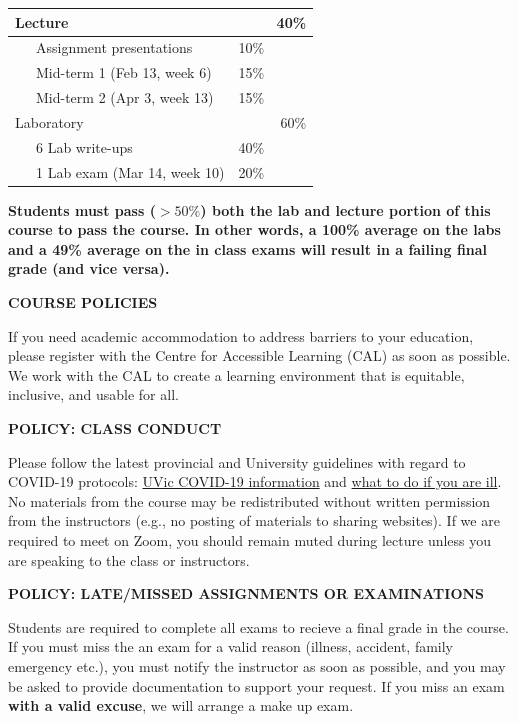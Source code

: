 \documentclass[11pt]{article}
\begin{document}
\begin{center}
		\begin{tabular}{ lr }
			Lecture                     & 40\%       \\
			\hline
			~~~Assignment presentations  & 10\%~~~~~~ \\
			~~~Mid-term 1 (Feb 13, week 6)  & 15\%~~~~~~ \\
			~~~Mid-term 2 (Apr 3, week 13)  & 15\%~~~~~~ \\
			Laboratory                  & 60\%       \\
			\hline
			~~~6 Lab write-ups    & 40\%~~~~~~  \\
			~~~1 Lab exam (Mar 14, week 10)    & 20\%~~~~~~  \\
		\end{tabular}
\end{center}

\textbf{Students must pass ($>50\%$) both the lab and lecture portion of this course to pass the course. In other words, a 100\% average on the labs and a 49\% average on the in class exams will result in a failing final grade (and vice versa).}

\clearpage

\begin{center}
  \textbf{COURSE POLICIES}
\end{center}

If you need academic accommodation to address barriers to your education, please register with the Centre for Accessible Learning (CAL) as soon as possible. We work with the CAL to create a learning environment that is equitable, inclusive, and usable for all.

\textbf{POLICY: CLASS CONDUCT}

Please follow the latest provincial and University guidelines with regard to COVID-19 protocols: \href{https://www.uvic.ca/covid19/index.php}{UVic COVID-19 information} and \href{https://www.uvic.ca/covid19/health-safety/index.php#ipn-if-you-re-sick}{what to do if you are ill}. No materials from the course may be redistributed without written permission from the instructors (e.g., no posting of materials to sharing websites). If we are required to meet on Zoom, you should remain muted during lecture unless you are speaking to the class or instructors.

\textbf{POLICY: LATE/MISSED ASSIGNMENTS OR EXAMINATIONS}

Students are required to complete all exams to recieve a final grade in the course. If you must miss the an exam for a valid reason (illness, accident, family emergency etc.), you must notify the instructor as soon as possible, and you may be asked to provide documentation to support your request. If you miss an exam \textbf{with a valid excuse}, we will arrange a make up exam.
\end{document}
